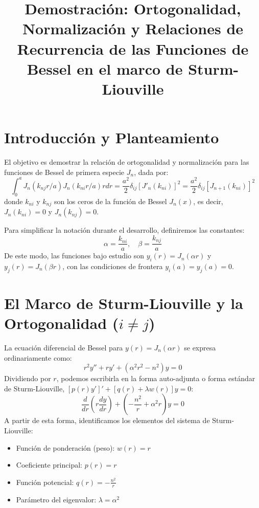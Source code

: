 \documentclass[11pt,a4paper]{article}
\title{Demostración: Ortogonalidad, Normalización y Relaciones de Recurrencia de las Funciones de Bessel en el marco de Sturm-Liouville}
\author{}
\date{}
\begin{document}
\maketitle

\section{Introducción y Planteamiento}
El objetivo es demostrar la relación de ortogonalidad y normalización para las funciones de Bessel de primera especie $J_n$, dada por:
\begin{equation}
	\int_0^a J_n(k_{nj}r/a)J_n(k_{ni}r/a)rdr = \frac{a^2}{2}\delta_{ij} [J'_n(k_{ni})]^2 = \frac{a^2}{2}\delta_{ij}[J_{n+1}(k_{ni})]^2
\end{equation}
donde $k_{ni}$ y $k_{nj}$ son los ceros de la función de Bessel $J_n(x)$, es decir, $J_n(k_{ni}) = 0$ y $J_n(k_{nj}) = 0$.

Para simplificar la notación durante el desarrollo, definiremos las constantes:
\begin{equation}
	\alpha = \frac{k_{ni}}{a}, \quad \beta = \frac{k_{nj}}{a}
\end{equation}
De este modo, las funciones bajo estudio son $y_i(r) = J_n(\alpha r)$ y $y_j(r) = J_n(\beta r)$, con las condiciones de frontera $y_i(a) = y_j(a) = 0$.

\section{El Marco de Sturm-Liouville y la Ortogonalidad ($i \neq j$)}
La ecuación diferencial de Bessel para $y(r) = J_n(\alpha r)$ se expresa ordinariamente como:
\begin{equation}
	r^2 y'' + r y' + (\alpha^2 r^2 - n^2) y = 0
\end{equation}
Dividiendo por $r$, podemos escribirla en la forma auto-adjunta o forma estándar de Sturm-Liouville, $[p(r)y']' + [q(r) + \lambda w(r)]y = 0$:
\begin{equation}
	\frac{d}{dr}\left( r \frac{dy}{dr} \right) + \left( -\frac{n^2}{r} + \alpha^2 r \right) y = 0
\end{equation}
A partir de esta forma, identificamos los elementos del sistema de Sturm-Liouville:
\begin{itemize}
	\item Función de ponderación (peso): $w(r) = r$
	\item Coeficiente principal: $p(r) = r$
	\item Función potencial: $q(r) = -\frac{n^2}{r}$
	\item Parámetro del eigenvalor: $\lambda = \alpha^2$
\end{itemize}
\end{document}

